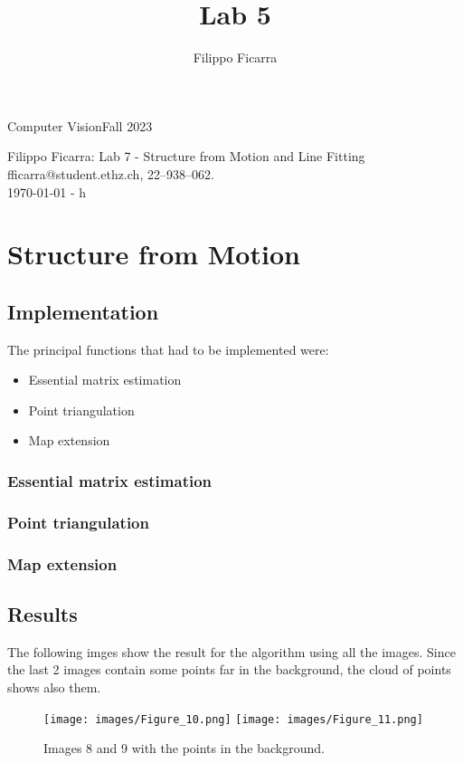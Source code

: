 \documentclass{ETHExercise}
\title{Lab 5}
\author{Filippo Ficarra}
\newcommand{\timestamp}{\ddmmyyyydate\today \,\,- \currenttime h}
\begin{document}
{}
{\Large Computer Vision}{Fall 2023}
\begin{center}
    {\Huge Filippo Ficarra: Lab 7 - Structure from Motion and Line Fitting}\\
      \quad\newline
      fficarra@student.ethz.ch, 22--938--062.\\
      \quad\newline
      \timestamp
      \end{center}



\section{Structure from Motion}
\subsection{Implementation}
The principal functions that had to be implemented were:
\begin{itemize}
  \item Essential matrix estimation
  \item Point triangulation
  \item Map extension
\end{itemize}

\subsubsection{Essential matrix estimation}

\subsubsection{Point triangulation}

\subsubsection{Map extension}

\subsection{Results}
The following imges show the result for the algorithm using all the images.
Since the last 2 images contain some points far in the background, the cloud of 
points shows also them.

\begin{figure}[!h]
    \texttt{[image: images/Figure\_10.png]}
  \endminipage
    \texttt{[image: images/Figure\_11.png]}
  \endminipage
  \caption{Images 8 and 9 with the points in the background.}
\end{figure}
\end{document}

